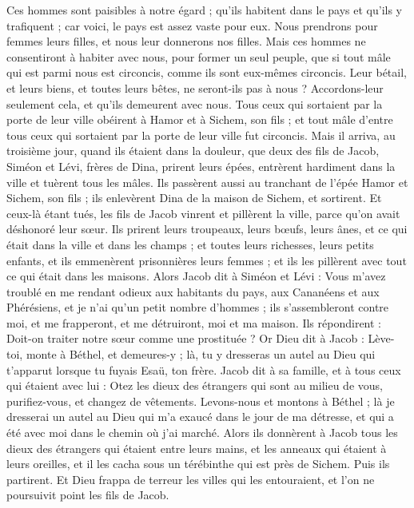 \begin{multicols}{2}
Ces hommes sont paisibles à notre égard ; qu'ils habitent dans le pays et qu'ils y trafiquent ; car voici, le pays est assez vaste pour eux. Nous prendrons pour femmes leurs filles, et nous leur donnerons nos filles.
Mais ces hommes ne consentiront à habiter avec nous, pour former un seul peuple, que si tout mâle qui est parmi nous est circoncis, comme ils sont eux-mêmes circoncis.
Leur bétail, et leurs biens, et toutes leurs bêtes, ne seront-ils pas à nous ? Accordons-leur seulement cela, et qu'ils demeurent avec nous.
Tous ceux qui sortaient par la porte de leur ville obéirent à Hamor et à Sichem, son fils ; et tout mâle d'entre tous ceux qui sortaient par la porte de leur ville fut circoncis.
Mais il arriva, au troisième jour, quand ils étaient dans la douleur, que deux des fils de Jacob, Siméon et Lévi, frères de Dina, prirent leurs épées, entrèrent hardiment dans la ville et tuèrent tous les mâles.
Ils passèrent aussi au tranchant de l'épée Hamor et Sichem, son fils ; ils enlevèrent Dina de la maison de Sichem, et sortirent.
Et ceux-là étant tués, les fils de Jacob vinrent et pillèrent la ville, parce qu'on avait déshonoré leur sœur.
Ils prirent leurs troupeaux, leurs bœufs, leurs ânes, et ce qui était dans la ville et dans les champs ;
et toutes leurs richesses, leurs petits enfants, et ils emmenèrent prisonnières leurs femmes ; et ils les pillèrent avec tout ce qui était dans les maisons.
Alors Jacob dit à Siméon et Lévi : Vous m'avez troublé en me rendant odieux aux habitants du pays, aux Cananéens et aux Phérésiens, et je n'ai qu'un petit nombre d'hommes ; ils s'assembleront contre moi, et me frapperont, et me détruiront, moi et ma maison.
Ils répondirent : Doit-on traiter notre sœur comme une prostituée ?
\VerseOne{}Or Dieu dit à Jacob : Lève-toi, monte à Béthel, et demeures-y ; là, tu y dresseras un autel au Dieu qui t'apparut lorsque tu fuyais Esaü, ton frère.
Jacob dit à sa famille, et à tous ceux qui étaient avec lui : Otez les dieux des étrangers qui sont au milieu de vous, purifiez-vous, et changez de vêtements.
Levons-nous et montons à Béthel ; là je dresserai un autel au Dieu qui m'a exaucé dans le jour de ma détresse, et qui a été avec moi dans le chemin où j'ai marché.
Alors ils donnèrent à Jacob tous les dieux des étrangers qui étaient entre leurs mains, et les anneaux qui étaient à leurs oreilles, et il les cacha sous un térébinthe qui est près de Sichem.
Puis ils partirent. Et Dieu frappa de terreur les villes qui les entouraient, et l'on ne poursuivit point les fils de Jacob.

\end{multicols}
